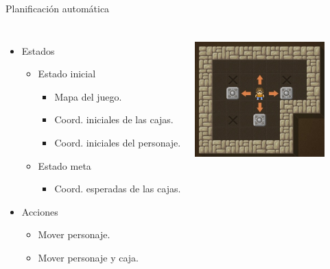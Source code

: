 \documentclass{beamer}
\begin{document}
\begin{frame}{Planificación automática}
    \begin{columns}
    \begin{itemize}
        \item Estados
        \begin{itemize}
        \item Estado inicial
        \begin{itemize}
            \item Mapa del juego.
            \item Coord. iniciales de las cajas.
            \item Coord. iniciales del personaje.
        \end{itemize}
        \item Estado meta
        \begin{itemize}
            \item Coord. esperadas de las cajas.
        \end{itemize}
        \end{itemize}
        \item Acciones
        \begin{itemize}
            \item Mover personaje.
            \item Mover personaje y caja.
        \end{itemize}
    \end{itemize}
        \includegraphics[width=5cm,height=5cm]{sokoban}
    \end{columns}
\end{frame}

\end{document}
